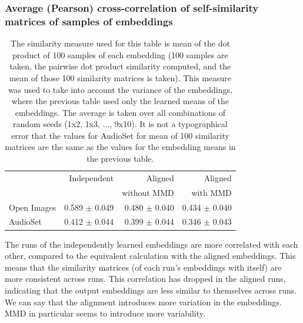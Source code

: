 \subsubsection{Average (Pearson) cross-correlation of self-similarity matrices of samples of embeddings}
\begin{table}[H]
\centering
\begin{tabular}{lrrr}
\toprule
       &   Independent & Aligned     &  Aligned  \\
       &               & without MMD &  with MMD \\
\midrule
Open Images    & 0.589 $\pm$ 0.049 & 0.480 $\pm$ 0.040 &     0.434 $\pm$  0.040 \\
AudioSet    & 0.412 $\pm$ 0.044 &  0.399 $\pm$ 0.044  &      0.346  $\pm$ 0.043  \\
\bottomrule
\end{tabular}
\caption{\label{table:corrsamples}The similarity measure used for this table is mean of the dot product of 100 samples of each embedding (100 samples are taken, the pairwise dot product similarity computed, and the mean of those 100 similarity matrices is taken). This measure was used to take into account the variance of the embeddings, where the previous table used only the learned means of the embeddings. The average is taken over all combinations of random seeds (1x2, 1x3, ..., 9x10). It is not a typographical error that the values for AudioSet for mean of 100 similarity matrices are the same as the values for the embedding means in the previous table. }
\end{table}

The runs of the independently learned embeddings are more correlated with each other, compared to the equivalent calculation with the aligned embeddings. This means that the similarity matrices (of each run's embeddings with itself) are more consistent across runs. This correlation has dropped in the aligned runs, indicating that the output embeddings are less similar to themselves across runs. We can say that the alignment introduces more variation in the embeddings. MMD in particular seems to introduce more variability. 

